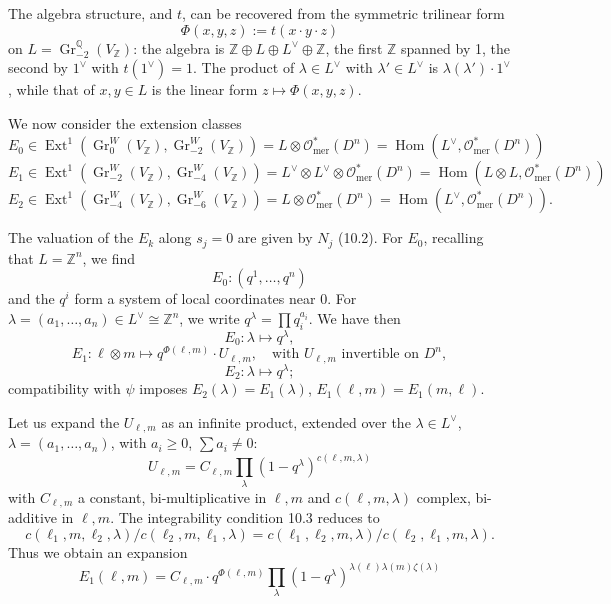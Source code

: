 \documentclass[11pt,a4paper]{article}
\theoremstyle{plain}
\theoremstyle{definition}
\DeclareMathOperator{\Ext}{Ext}
\DeclareMathOperator{\Hom}{Hom}
\DeclareMathOperator{\Gr}{Gr}
\begin{document}
The algebra structure, and $t$, can be recovered from the symmetric trilinear form
\[
\Phi(x, y, z) := t(x \cdot y \cdot z)
\]
on $L = \Gr_{-2}^{\mathbb{Q}}(V_{\mathbb{Z}})$: the algebra is $\mathbb{Z} \oplus L \oplus L^{\vee} \oplus \mathbb{Z}$, the first $\mathbb{Z}$ spanned by 1, the second by $1^{\vee}$ with $t(1^{\vee}) = 1$. The product of $\lambda \in L^{\vee}$ with $\lambda' \in L^{\vee}$ is $\lambda(\lambda') \cdot 1^{\vee}$, while that of $x, y \in L$ is the linear form $z \mapsto \Phi(x, y, z)$.

We now consider the extension classes
\[
E_{0} \in \Ext^{1}(\Gr_{0}^{W}(V_{\mathbb{Z}}), \Gr_{-2}^{W}(V_{\mathbb{Z}})) = L \otimes \mathcal{O}_{\text{mer}}^{*}(D^{n}) = \Hom(L^{\vee}, \mathcal{O}_{\text{mer}}^{*}(D^{n}))
\]
\[
E_{1} \in \Ext^{1}(\Gr_{-2}^{W}(V_{\mathbb{Z}}), \Gr_{-4}^{W}(V_{\mathbb{Z}})) = L^{\vee} \otimes L^{\vee} \otimes \mathcal{O}_{\text{mer}}^{*}(D^{n}) = \Hom(L \otimes L, \mathcal{O}_{\text{mer}}^{*}(D^{n}))
\]
\[
E_{2} \in \Ext^{1}(\Gr_{-4}^{W}(V_{\mathbb{Z}}), \Gr_{-6}^{W}(V_{\mathbb{Z}})) = L \otimes \mathcal{O}_{\text{mer}}^{*}(D^{n}) = \Hom(L^{\vee}, \mathcal{O}_{\text{mer}}^{*}(D^{n})).
\]

The valuation of the $E_{k}$ along $s_{j} = 0$ are given by $N_{j}$ (10.2). For $E_{0}$, recalling that $L = \mathbb{Z}^{n}$, we find
\[
E_{0}: (q^{1}, \ldots, q^{n})
\]
and the $q^{i}$ form a system of local coordinates near 0. For $\lambda = (a_{1}, \ldots, a_{n}) \in L^{\vee} \cong \mathbb{Z}^{n}$, we write $q^{\lambda} = \prod q_{i}^{a_{i}}$. We have then
\[
E_{0}: \lambda \longmapsto q^{\lambda},
\]
\[
E_{1}: \ell \otimes m \longmapsto q^{\Phi(\ell, m)} \cdot U_{\ell, m}, \quad \text{with } U_{\ell, m} \text{ invertible on } D^{n},
\]
\[
E_{2}: \lambda \longmapsto q^{\lambda};
\]
compatibility with $\psi$ imposes $E_{2}(\lambda) = E_{1}(\lambda)$, $E_{1}(\ell, m) = E_{1}(m, \ell)$.

Let us expand the $U_{\ell, m}$ as an infinite product, extended over the $\lambda \in L^{\vee}$, $\lambda = (a_{1}, \ldots, a_{n})$, with $a_{i} \geq 0$, $\sum a_{i} \neq 0$:
\[
U_{\ell, m} = C_{\ell, m} \prod_{\lambda}(1 - q^{\lambda})^{c(\ell, m, \lambda)}
\]
with $C_{\ell, m}$ a constant, bi-multiplicative in $\ell, m$ and $c(\ell, m, \lambda)$ complex, bi-additive in $\ell, m$. The integrability condition 10.3 reduces to
\[
c(\ell_{1}, m, \ell_{2}, \lambda) / c(\ell_{2}, m, \ell_{1}, \lambda) = c(\ell_{1}, \ell_{2}, m, \lambda) / c(\ell_{2}, \ell_{1}, m, \lambda).
\]
Thus we obtain an expansion
\[
E_{1}(\ell, m) = C_{\ell, m} \cdot q^{\Phi(\ell, m)} \prod_{\lambda}(1 - q^{\lambda})^{\lambda(\ell) \lambda(m) \zeta(\lambda)}
\]
\end{document}
